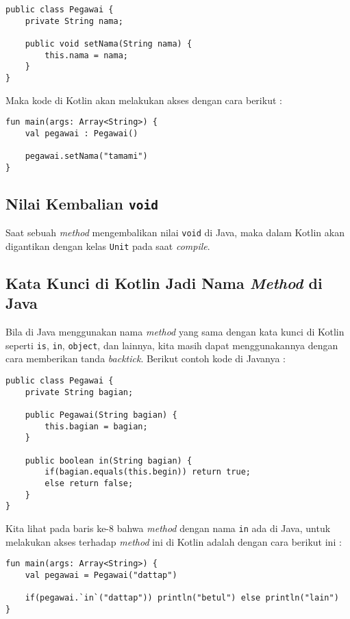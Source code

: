 \begin{lstlisting}
public class Pegawai {
	private String nama;
	
	public void setNama(String nama) {
		this.nama = nama;
	}
}
\end{lstlisting}

Maka kode di Kotlin akan melakukan akses dengan cara berikut :

\begin{lstlisting}
fun main(args: Array<String>) {
	val pegawai : Pegawai()
	
	pegawai.setNama("tamami")
}
\end{lstlisting}

\subsection{Nilai Kembalian \texttt{void}}

Saat sebuah \textit{method} mengembalikan nilai \texttt{void} di Java, maka dalam Kotlin akan digantikan dengan kelas \texttt{Unit} pada saat \textit{compile}.

\subsection{Kata Kunci di Kotlin Jadi Nama \textit{Method} di Java}

Bila di Java menggunakan nama \textit{method} yang sama dengan kata kunci di Kotlin seperti \texttt{is}, \texttt{in}, \texttt{object}, dan lainnya, kita masih dapat menggunakannya dengan cara memberikan tanda \textit{backtick}. Berikut contoh kode di Javanya :

\begin{lstlisting}
public class Pegawai {
	private String bagian;
	
	public Pegawai(String bagian) {
		this.bagian = bagian;
	}
		
	public boolean in(String bagian) {
		if(bagian.equals(this.begin)) return true;
		else return false;
	}
}
\end{lstlisting}

Kita lihat pada baris ke-8 bahwa \textit{method} dengan nama \texttt{in} ada di Java, untuk melakukan akses terhadap \textit{method} ini di Kotlin adalah dengan cara berikut ini :

\begin{lstlisting}
fun main(args: Array<String>) {
	val pegawai = Pegawai("dattap")
	
	if(pegawai.`in`("dattap")) println("betul") else println("lain")
}
\end{lstlisting}

